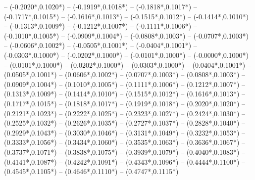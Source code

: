 {	-- ({-0.2020*\dx},{0.1020*\dy})
	-- ({-0.1919*\dx},{0.1018*\dy})
	-- ({-0.1818*\dx},{0.1017*\dy})
	-- ({-0.1717*\dx},{0.1015*\dy})
	-- ({-0.1616*\dx},{0.1013*\dy})
	-- ({-0.1515*\dx},{0.1012*\dy})
	-- ({-0.1414*\dx},{0.1010*\dy})
	-- ({-0.1313*\dx},{0.1009*\dy})
	-- ({-0.1212*\dx},{0.1007*\dy})
	-- ({-0.1111*\dx},{0.1006*\dy})
	-- ({-0.1010*\dx},{0.1005*\dy})
	-- ({-0.0909*\dx},{0.1004*\dy})
	-- ({-0.0808*\dx},{0.1003*\dy})
	-- ({-0.0707*\dx},{0.1003*\dy})
	-- ({-0.0606*\dx},{0.1002*\dy})
	-- ({-0.0505*\dx},{0.1001*\dy})
	-- ({-0.0404*\dx},{0.1001*\dy})
	-- ({-0.0303*\dx},{0.1000*\dy})
	-- ({-0.0202*\dx},{0.1000*\dy})
	-- ({-0.0101*\dx},{0.1000*\dy})
	-- ({-0.0000*\dx},{0.1000*\dy})
	-- ({0.0101*\dx},{0.1000*\dy}) %
	-- ({0.0202*\dx},{0.1000*\dy}) %
	-- ({0.0303*\dx},{0.1000*\dy}) %
	-- ({0.0404*\dx},{0.1001*\dy}) %
	-- ({0.0505*\dx},{0.1001*\dy}) %
	-- ({0.0606*\dx},{0.1002*\dy}) %
	-- ({0.0707*\dx},{0.1003*\dy}) %
	-- ({0.0808*\dx},{0.1003*\dy}) %
	-- ({0.0909*\dx},{0.1004*\dy}) %
	-- ({0.1010*\dx},{0.1005*\dy}) %
	-- ({0.1111*\dx},{0.1006*\dy}) %
	-- ({0.1212*\dx},{0.1007*\dy}) %
	-- ({0.1313*\dx},{0.1009*\dy}) %
	-- ({0.1414*\dx},{0.1010*\dy}) %
	-- ({0.1515*\dx},{0.1012*\dy}) %
	-- ({0.1616*\dx},{0.1013*\dy}) %
	-- ({0.1717*\dx},{0.1015*\dy}) %
	-- ({0.1818*\dx},{0.1017*\dy}) %
	-- ({0.1919*\dx},{0.1018*\dy}) %
	-- ({0.2020*\dx},{0.1020*\dy}) %
	-- ({0.2121*\dx},{0.1023*\dy}) %
	-- ({0.2222*\dx},{0.1025*\dy}) %
	-- ({0.2323*\dx},{0.1027*\dy}) %
	-- ({0.2424*\dx},{0.1030*\dy}) %
	-- ({0.2525*\dx},{0.1032*\dy}) %
	-- ({0.2626*\dx},{0.1035*\dy}) %
	-- ({0.2727*\dx},{0.1037*\dy}) %
	-- ({0.2828*\dx},{0.1040*\dy}) %
	-- ({0.2929*\dx},{0.1043*\dy}) %
	-- ({0.3030*\dx},{0.1046*\dy}) %
	-- ({0.3131*\dx},{0.1049*\dy}) %
	-- ({0.3232*\dx},{0.1053*\dy}) %
	-- ({0.3333*\dx},{0.1056*\dy}) %
	-- ({0.3434*\dx},{0.1060*\dy}) %
	-- ({0.3535*\dx},{0.1063*\dy}) %
	-- ({0.3636*\dx},{0.1067*\dy}) %
	-- ({0.3737*\dx},{0.1071*\dy}) %
	-- ({0.3838*\dx},{0.1075*\dy}) %
	-- ({0.3939*\dx},{0.1079*\dy}) %
	-- ({0.4040*\dx},{0.1083*\dy}) %
	-- ({0.4141*\dx},{0.1087*\dy}) %
	-- ({0.4242*\dx},{0.1091*\dy}) %
	-- ({0.4343*\dx},{0.1096*\dy}) %
	-- ({0.4444*\dx},{0.1100*\dy}) %
	-- ({0.4545*\dx},{0.1105*\dy}) %
	-- ({0.4646*\dx},{0.1110*\dy}) %
	-- ({0.4747*\dx},{0.1115*\dy}) %
}

